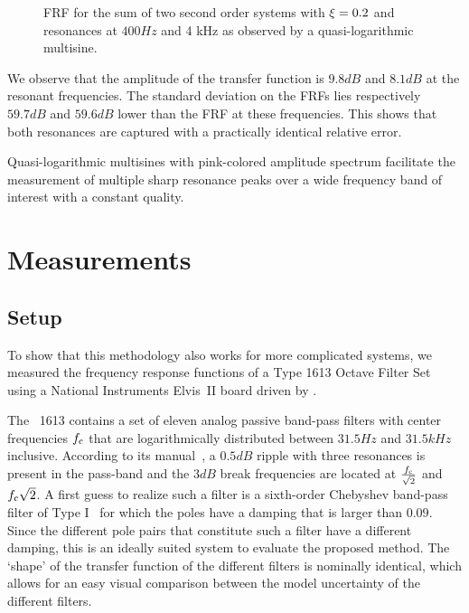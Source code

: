 \begin{figure}%
  \centering
  \setlength{}
  \setlength\figureheight{0.68\figurewidth}
  
  \caption{FRF for the sum of two second order systems with $\xi_{}=0.2$ and
           resonances at $ 400 \unit{Hz}$ and 4 \unit{kHz} as observed by a quasi-logarithmic multisine.}%
  \label{fig:excitation:sumSys}
\end{figure}

We observe that the amplitude of the transfer function is $9.8\unit{dB}$ and $8.1\unit{dB}$ at the resonant frequencies.
The standard deviation on the \glspl{FRF} lies respectively $59.7 \unit{dB}$ and $59.6 \unit{dB}$ lower than the \gls{FRF} at these frequencies. 
This shows that both resonances are captured with a practically identical relative error.

\begin{guideline}
  Quasi-logarithmic multisines with pink-colored amplitude spectrum facilitate the measurement of multiple sharp resonance peaks over a wide frequency band of interest with a constant quality.
\end{guideline}
  
\section{Measurements} 
\label{sec:excitation:measurement}
  \subsection{Setup}
    \label{sec:excitation:measurement:setup}
    To show that this methodology also works for more complicated systems, we measured the frequency response functions of a \bruelkjaer Type 1613 Octave Filter Set using a National Instruments Elvis~II board driven by \labview.
    
    The \BK~1613 contains a set of eleven analog passive band-pass filters with center frequencies $f_{\mathrm{c}}$ that are logarithmically distributed between $31.5\unit{Hz}$ and $31.5\unit{kHz}$ inclusive.
    According to its manual~\citep{datasheet_bk1613}, a $0.5\unit{dB}$ ripple with three resonances is present in the pass-band and the $3\unit{dB}$ break frequencies are located at $\frac{f_{\mathrm{c}}}{\sqrt{2}}$ and $f_{\mathrm{c}} \sqrt{2}$.
    A first guess to realize such a filter is a sixth-order Chebyshev band-pass filter of Type I~\citep{Zverev1967} for which the poles have a damping that is larger than $0.09$.
    Since the different pole pairs that constitute such a filter have a different damping, this is an ideally suited system to evaluate the proposed method.
    The `shape' of the transfer function of the different filters is nominally identical, which allows for an easy visual comparison between the model uncertainty of the different filters.

